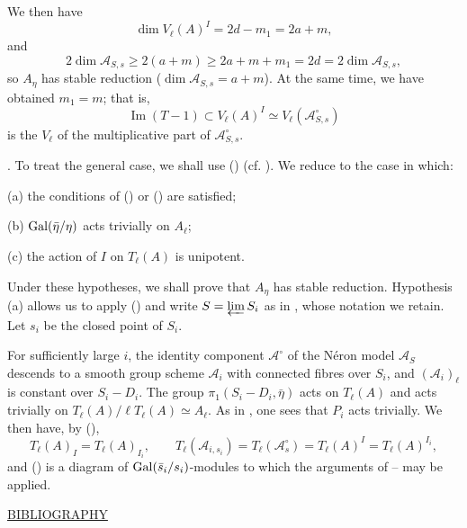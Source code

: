 We then have
\[
 \dim V_\ell(A)^I=2d-m_1=2a+m,
\]
and
\[
 2\dim\mathcal A_{S,s}\geq 2(a+m)\geq
 2a+m+m_1=2d=2\dim\mathcal A_{S,s},
\]
so $A_\eta$ has stable reduction
($\dim\mathcal A_{S,s}=a+m$). At the same time, we have obtained
$m_1=m$; that is,
\[
 \operatorname{Im}(T-1)\subset V_\ell(A)^I\simeq
 V_\ell(\mathcal A^\circ_{S,s})
\]
is the $V_\ell$ of the multiplicative part of
$\mathcal A^\circ_{S,s}$.

. To treat the general case, we shall use () (cf. ). We reduce
to the case in which:


(a) the conditions of () or () are satisfied;

(b) $\operatorname{Gal}(\bar\eta/\eta)$ acts trivially on $A_\ell$;

(c) the action of $I$ on $T_\ell(A)$ is unipotent.

Under these hypotheses, we shall prove that $A_\eta$ has stable
reduction. Hypothesis (a) allows us to apply () and write
$S=\varprojlim S_i$ as in , whose notation we retain. Let $s_i$ be
the closed point of $S_i$.

For sufficiently large $i$, the identity component $\mathcal A^\circ$
of the N\'eron model $\mathcal A_S$ descends to a smooth group scheme
$\mathcal A_i$ with connected fibres over $S_i$, and
$(\mathcal A_i)_\ell$ is constant over $S_i-D_i$. The group
$\pi_1(S_i-D_i,\bar\eta)$ acts on $T_\ell(A)$ and acts trivially on
$T_\ell(A)/\ell T_\ell(A)\simeq A_\ell$. As in , one sees that
$P_i$ acts trivially. We then have, by (),
\[
 T_\ell(A)_I=T_\ell(A)_{I_i},\qquad
 T_\ell(\mathcal A_{i,s_i})=T_\ell(\mathcal A^\circ_s)
 =T_\ell(A)^I=T_\ell(A)^{I_i},
\]
and () is a diagram of $\operatorname{Gal}(\bar s_i/s_i)$-modules to which the
arguments of -- may be applied.


\begin{center}
\underline{BIBLIOGRAPHY}
\end{center}

